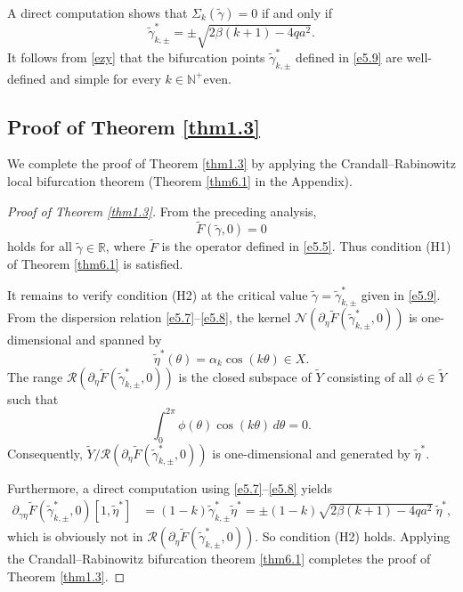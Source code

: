 \documentclass[reqno]{amsart}
\numberwithin{equation}{section}
\numberwithin{equation}{section}
\numberwithin{equation}{section}
\begin{document}
A direct computation shows that \(\Sigma_k(\widetilde{\gamma}) = 0\) if and only if
\begin{equation}\label{e5.9}
\widetilde{\gamma}_{k,\pm}^* =\pm\sqrt{2\beta(k+1)-4qa^2} .
\end{equation}
It follows from \eqref{ezy} that the bifurcation points $\widetilde{\gamma}_{k,\pm}^*$ defined in \eqref{e5.9} are well-defined and simple for every $k\in\mathbb{N}^{+}{\mathrm{even}}$.


\subsection{Proof of Theorem \ref{thm1.3}}

We complete the proof of Theorem \ref{thm1.3} by applying the Crandall--Rabinowitz local bifurcation theorem (Theorem \ref{thm6.1} in the Appendix).

\begin{proof}[Proof of Theorem \ref{thm1.3}]
From the preceding analysis,
$$
\widetilde{F}(\widetilde{\gamma},0)=0
$$
holds for all \(\widetilde{\gamma} \in \mathbb{R}\), where \(\widetilde{F}\) is the operator defined in \eqref{e5.5}. Thus condition (H1) of Theorem \ref{thm6.1} is satisfied.

It remains to verify condition (H2) at the critical value \(\widetilde{\gamma} = \widetilde{\gamma}_{k,\pm}^*\) given in \eqref{e5.9}. From the dispersion relation \eqref{e5.7}--\eqref{e5.8}, the kernel \(\mathcal{N}(\partial_\eta \widetilde{F}(\widetilde{\gamma}_{k,\pm}^*,0))\) is one-dimensional and spanned by
\[
\widetilde{\eta}^*(\theta) = \alpha_k \cos(k\theta) \in X.
\]
The range \(\mathcal{R}(\partial_\eta \widetilde{F}(\widetilde{\gamma}_{k,\pm}^*,0))\) is the closed subspace of \(\widetilde{Y}\) consisting of all \(\phi \in \widetilde{Y}\) such that
\[
\int_0^{2\pi} \phi(\theta)\cos(k\theta) \, d\theta = 0.
\]
Consequently, \(\widetilde{Y} / \mathcal{R}(\partial_\eta \widetilde{F}(\widetilde{\gamma}_{k,\pm}^*,0))\) is one-dimensional and generated by \(\widetilde{\eta}^*\).

Furthermore, a direct computation using \eqref{e5.7}--\eqref{e5.8} yields
\begin{equation}
\begin{aligned}
\partial_{\gamma\eta} \widetilde{F}(\widetilde{\gamma}_{k,\pm}^*,0)[1,\widetilde{\eta}^*] &= (1-k)\widetilde{\gamma}_{k,\pm}^* \widetilde{\eta}^* =\pm(1-k)\sqrt{2\beta(k+1)-4qa^2}~ \widetilde{\eta}^*, \nonumber
\end{aligned}
\end{equation}
which is obviously not in $\mathcal{R}(\partial_\eta \widetilde{F}(\widetilde{\gamma}_{k,\pm}^*,0)).$
So condition (H2) holds.
Applying the Crandall--Rabinowitz bifurcation theorem \ref{thm6.1} completes the proof of Theorem \ref{thm1.3}.
\end{proof}
\end{document}
